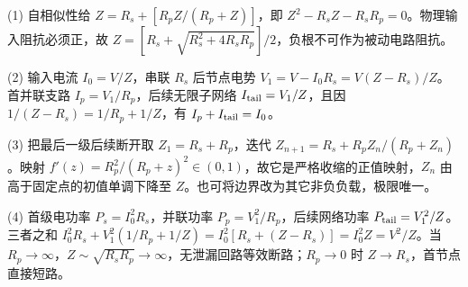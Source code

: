 (1) 自相似性给 \(Z=R_s+[R_pZ/(R_p+Z)]\)，即 \(Z^2-R_sZ-R_sR_p=0\)。物理输入阻抗必须正，故 \(Z=[R_s+\sqrt{R_s^2+4R_sR_p}]/2\)，负根不可作为被动电路阻抗。

(2) 输入电流 \(I_0=V/Z\)，串联 \(R_s\) 后节点电势 \(V_1=V-I_0R_s=V(Z-R_s)/Z\)。首并联支路 \(I_p=V_1/R_p\)，后续无限子网络 \(I_{\rm tail}=V_1/Z\)，且因 \(1/(Z-R_s)=1/R_p+1/Z\)，有 \(I_p+I_{\rm tail}=I_0\)。

(3) 把最后一级后续断开取 \(Z_1=R_s+R_p\)，迭代 \(Z_{n+1}=R_s+R_pZ_n/(R_p+Z_n)\)。映射 \(f'(z)=R_p^2/(R_p+z)^2\in(0,1)\)，故它是严格收缩的正值映射，\(Z_n\) 由高于固定点的初值单调下降至 \(Z\)。也可将边界改为其它非负负载，极限唯一。

(4) 首级电功率 \(P_s=I_0^2R_s\)，并联功率 \(P_p=V_1^2/R_p\)，后续网络功率 \(P_{\rm tail}=V_1^2/Z\)。三者之和 \(I_0^2R_s+V_1^2(1/R_p+1/Z)=I_0^2[R_s+(Z-R_s)]=I_0^2Z=V^2/Z\)。当 \(R_p\to\infty\)，\(Z\sim\sqrt{R_sR_p}\to\infty\)，无泄漏回路等效断路；\(R_p\to0\) 时 \(Z\to R_s\)，首节点直接短路。
